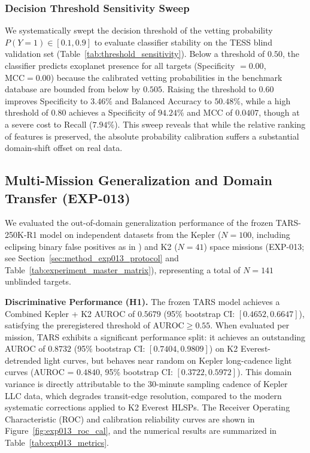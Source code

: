 

\subsubsection{Decision Threshold Sensitivity Sweep}
We systematically swept the decision threshold of the vetting probability $P(Y=1) \in [0.1, 0.9]$ to evaluate classifier stability on the TESS blind validation set (Table~\ref{tab:threshold_sensitivity}). Below a threshold of $0.50$, the classifier predicts exoplanet presence for all targets (Specificity $= 0.00$, $\text{MCC} = 0.00$) because the calibrated vetting probabilities in the benchmark database are bounded from below by $0.505$. Raising the threshold to $0.60$ improves Specificity to $3.46\%$ and Balanced Accuracy to $50.48\%$, while a high threshold of $0.80$ achieves a Specificity of $94.24\%$ and MCC \citep{Matthews1975} of $0.0407$, though at a severe cost to Recall ($7.94\%$). This sweep reveals that while the relative ranking of features is preserved, the absolute probability calibration suffers a substantial domain-shift offset on real data.



\subsection{Multi-Mission Generalization and Domain Transfer (EXP-013)} \label{sec:results_exp013} \label{sec:exp013}

We evaluated the out-of-domain generalization performance of the frozen TARS-250K-R1 model on independent datasets from the Kepler \citep[processed via the SPOC pipeline;][]{Jenkins2016} ($N = 100$, including eclipsing binary false positives as in \cite{Carter2013}) and K2 ($N = 41$) space missions (EXP-013; see Section~\ref{sec:method_exp013_protocol} and Table~\ref{tab:experiment_master_matrix}), representing a total of $N = 141$ unblinded targets. 

\textbf{Discriminative Performance (H1).} The frozen TARS model achieves a Combined Kepler + K2 AUROC of $0.5679$ (95\% bootstrap CI: $[0.4652, 0.6647]$), satisfying the preregistered threshold of $\text{AUROC} \ge 0.55$. When evaluated per mission, TARS exhibits a significant performance split: it achieves an outstanding AUROC of $0.8732$ (95\% bootstrap CI: $[0.7404, 0.9809]$) on K2 Everest-detrended light curves, but behaves near random on Kepler long-cadence light curves (AUROC = $0.4840$, 95\% bootstrap CI: $[0.3722, 0.5972]$). This domain variance is directly attributable to the 30-minute sampling cadence of Kepler LLC data, which degrades transit-edge resolution, compared to the modern systematic corrections applied to K2 Everest HLSPs. The Receiver Operating Characteristic (ROC) and calibration reliability curves are shown in Figure~\ref{fig:exp013_roc_cal}, and the numerical results are summarized in Table~\ref{tab:exp013_metrics}.

